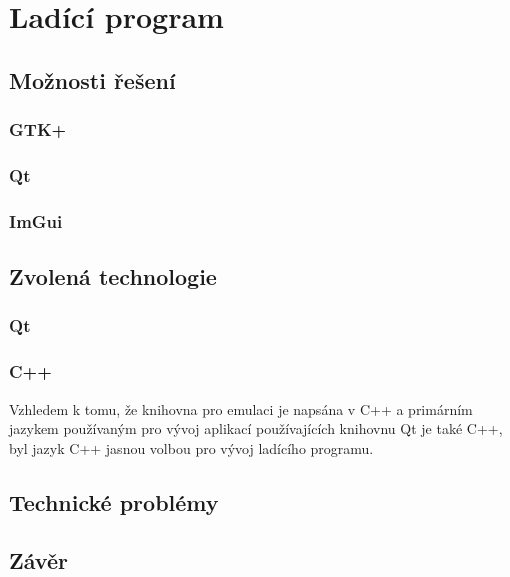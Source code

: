 \chapter{Ladící program}

\blind[2]

\section{Možnosti řešení}

\blind[1]

\subsection{GTK+}

\blind[1]

\subsection{Qt}

\blind[2]

\subsection{ImGui}

\blind[3]

\section{Zvolená technologie}

\subsection{Qt}

\blind[2]

\subsection{C++}

Vzhledem k tomu, že knihovna pro emulaci je napsána v C++ a primárním jazykem používaným pro vývoj aplikací používajících knihovnu Qt je také C++, byl jazyk C++ jasnou volbou pro vývoj ladícího programu.

\blind[1]

\section{Technické problémy}

\blind[4]

\section{Závěr}


\blind[1]